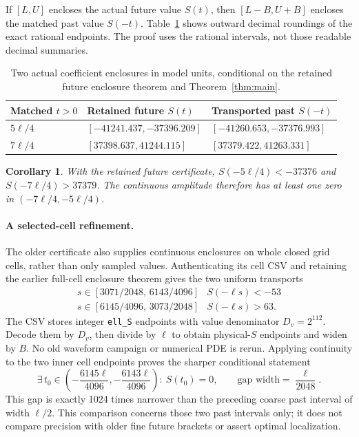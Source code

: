 \documentclass[10pt]{article}
\newtheorem{corollary}[theorem]{Corollary}
\begin{document}
If \([L,U]\) encloses the actual future value \(S(t)\), then
\([L-B,U+B]\) encloses the matched past value \(S(-t)\).
Table~\ref{tab:transfer} shows outward decimal roundings of the exact
rational endpoints. The proof uses the rational intervals, not those
readable decimal summaries.
\begin{table}[ht]
\centering
\small
\begin{tabular}{@{}lll@{}}
\toprule
Matched \(t>0\)&Retained future \(S(t)\)&Transported past \(S(-t)\)\\
\midrule
\(5\ell/4\)&\([-41241.437,-37396.209]\)&\([-41260.653,-37376.993]\)\\
\(7\ell/4\)&\([37398.637,41244.115]\)&\([37379.422,41263.331]\)\\
\bottomrule
\end{tabular}
\caption{Two actual coefficient enclosures in model units, conditional on
the retained future enclosure theorem and Theorem~\ref{thm:main}.}
\label{tab:transfer}
\end{table}

\begin{corollary}
With the retained future certificate, \(S(-5\ell/4)<-37376\) and
\(S(-7\ell/4)>37379\). The continuous amplitude therefore has at least
one zero in \((-7\ell/4,-5\ell/4)\).
\end{corollary}

\paragraph{A selected-cell refinement.}
The older certificate also supplies continuous enclosures on whole closed
grid cells, rather than only sampled values. Authenticating its cell CSV
and retaining the earlier full-cell enclosure theorem gives the two
uniform transports
\begin{equation}\label{eq:cells}
 \begin{array}{c|c}
 s\in[3071/2048,\,6143/4096]&S(-\ell s)<-53\\[2pt]
 s\in[6145/4096,\,3073/2048]&S(-\ell s)>63.
 \end{array}
\end{equation}
The CSV stores integer \texttt{ell\_S} endpoints with value denominator
\(D_v=2^{112}\). Decode them by \(D_v\), then divide by \(\ell\) to obtain
physical-\(S\) endpoints and widen by \(B\). No old waveform
campaign or numerical PDE is rerun. Applying continuity to the two inner
cell endpoints proves the sharper conditional statement
\begin{equation}\label{eq:refinedzero}
 \exists\,t_0\in
 \left(-\frac{6145\ell}{4096},-\frac{6143\ell}{4096}\right):
 \ S(t_0)=0,\qquad
 \text{gap width}=\frac{\ell}{2048}.
\end{equation}
This gap is exactly 1024 times narrower than the preceding coarse past
interval of width \(\ell/2\). This comparison concerns those two past
intervals only; it does not compare precision with older fine future
brackets or assert optimal localization.
\end{document}
